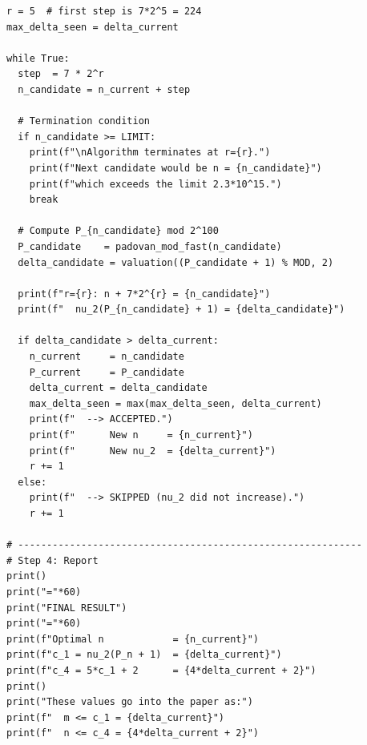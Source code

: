 \documentclass[11pt,a4paper]{article}
\numberwithin{equation}{section}
\numberwithin{table}{section}
\numberwithin{figure}{section}
\begin{document}
\begin{verbatim}
r = 5  # first step is 7*2^5 = 224
max_delta_seen = delta_current

while True:
  step  = 7 * 2^r
  n_candidate = n_current + step

  # Termination condition
  if n_candidate >= LIMIT:
    print(f"\nAlgorithm terminates at r={r}.")
    print(f"Next candidate would be n = {n_candidate}")
    print(f"which exceeds the limit 2.3*10^15.")
    break

  # Compute P_{n_candidate} mod 2^100
  P_candidate    = padovan_mod_fast(n_candidate)
  delta_candidate = valuation((P_candidate + 1) % MOD, 2)

  print(f"r={r}: n + 7*2^{r} = {n_candidate}")
  print(f"  nu_2(P_{n_candidate} + 1) = {delta_candidate}")

  if delta_candidate > delta_current:
    n_current     = n_candidate
    P_current     = P_candidate
    delta_current = delta_candidate
    max_delta_seen = max(max_delta_seen, delta_current)
    print(f"  --> ACCEPTED.")
    print(f"      New n     = {n_current}")
    print(f"      New nu_2  = {delta_current}")
    r += 1
  else:
    print(f"  --> SKIPPED (nu_2 did not increase).")
    r += 1 

# ------------------------------------------------------------
# Step 4: Report
print()
print("="*60)
print("FINAL RESULT")
print("="*60)
print(f"Optimal n            = {n_current}")
print(f"c_1 = nu_2(P_n + 1)  = {delta_current}")
print(f"c_4 = 5*c_1 + 2      = {4*delta_current + 2}")
print()
print("These values go into the paper as:")
print(f"  m <= c_1 = {delta_current}")
print(f"  n <= c_4 = {4*delta_current + 2}")
 \end{verbatim}
\end{document}
